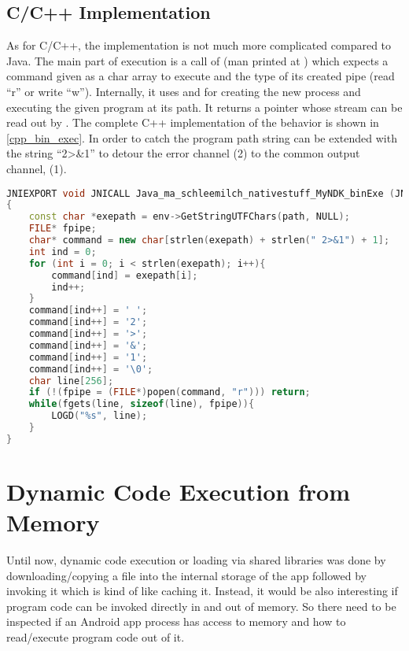 \subsection{C/C++ Implementation}\label{dyn_bin_c}
As for C/C++, the implementation is not much more complicated compared to Java.
The main part of execution is a call of  
(man printed at \parencite{popen}) which expects a command 
given as a char array to execute and the type of its created pipe (read ``r'' or write ``w''). Internally, it uses  and  for creating the new 
process and executing the given program at its path. It returns a  pointer
whose stream can be read out by . The complete C++ implementation
of the behavior is shown in \autoref{cpp_bin_exec}. In order to catch 
the program path string can be extended with the string ``2>\&1'' to detour the error
channel (2) to the common output channel,  (1).
\begin{lstlisting}[language=C++, caption=C++ Native Exec(), label=cpp_bin_exec]
JNIEXPORT void JNICALL Java_ma_schleemilch_nativestuff_MyNDK_binExe (JNIEnv *env, object obj, jstring path)
{
	const char *exepath = env->GetStringUTFChars(path, NULL);
	FILE* fpipe;
	char* command = new char[strlen(exepath) + strlen(" 2>&1") + 1];
	int ind = 0;
	for (int i = 0; i < strlen(exepath); i++){
		command[ind] = exepath[i];
		ind++;
	}
	command[ind++] = ' ';
	command[ind++] = '2';
	command[ind++] = '>';
	command[ind++] = '&';
	command[ind++] = '1';
	command[ind++] = '\0';
	char line[256];
	if (!(fpipe = (FILE*)popen(command, "r"))) return;
	while(fgets(line, sizeof(line), fpipe)){
		LOGD("%s", line);
	}
}
\end{lstlisting}

\section{Dynamic Code Execution from Memory}\label{section:dyn_code_memory}

Until now, dynamic code execution or loading via shared libraries was done
by downloading/copying a file into the internal storage of the app followed
by invoking it which is kind of like caching it. Instead,
it would be also interesting if program code can be invoked directly in and out
of memory. So there need to be inspected if an Android app process has access
to memory and how to read/execute program code out of it.   

